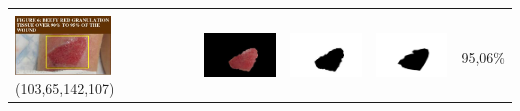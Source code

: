 \begin{table}[H]
\begin{tabular}{|m{1.0in}|m{1.0in}|m{1.0in}|m{1.0in}|m{0.6in}|}
		&  &  & \\
		\includegraphics[width=1.0in]{gambar/hasil_segmentasi/luka_merah/image_31_rect.jpg} {\centering\fontsize{10}{10}\selectfont(103,65,142,107)}&
		\includegraphics[width=1.0in]{gambar/hasil_segmentasi/luka_merah/result_31.jpg}&
		\includegraphics[width=1.0in]{gambar/hasil_segmentasi/luka_merah/mask_r_31.jpg}&
		\includegraphics[width=1.0in]{gambar/hasil_segmentasi/luka_merah/31_r.jpg}&
		95,06\% \\
		\hline
	\end{tabular}
\end{table}

